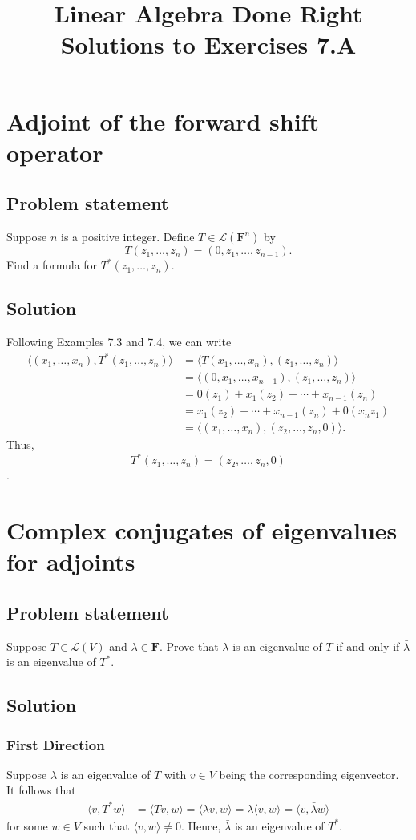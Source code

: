 \documentclass{article}
\title{Linear Algebra Done Right\\Solutions to Exercises 7.A}
\author{}
\date{}
\begin{document}
\maketitle

\section{Adjoint of the forward shift operator}
\subsection*{Problem statement}
Suppose $n$ is a positive integer. Define $T\in\mathcal{L}(\mathbf{F}^{n})$ by
\[T(z_1,\ldots,z_n)=(0,z_1,\ldots,z_{n-1}).\]
Find a formula for $T^*(z_1,\ldots,z_n)$.

\subsection*{Solution}
Following Examples 7.3 and 7.4, we can write
\begin{align*} 
\langle(x_1,\ldots,x_n),T^*(z_1,\ldots,z_n)\rangle &= \langle T(x_1,\ldots,x_n),(z_1,\ldots,z_n)\rangle \\ 
 &= \langle (0,x_1,\ldots,x_{n-1}),(z_1,\ldots,z_n)\rangle \\
 &= 0(z_1) + x_1(z_2) + \cdots + x_{n-1}(z_n) \\
 &= x_1(z_2) + \cdots + x_{n-1}(z_n) + 0(x_nz_1) \\
 &= \langle (x_1,\ldots,x_n),(z_2,\ldots,z_n,0)\rangle.
\end{align*}
Thus,
\[T^*(z_1,\ldots,z_n)=(z_2,\ldots,z_n,0)\].

\clearpage

\section{Complex conjugates of eigenvalues for adjoints}
\subsection*{Problem statement}
Suppose $T\in\mathcal{L}(V)$ and $\lambda\in\mathbf{F}$. Prove that $\lambda$ is an eigenvalue of $T$ if and only if $\bar{\lambda}$ is an eigenvalue of $T^*$.

\subsection*{Solution}
\subsubsection*{First Direction}
Suppose $\lambda$ is an eigenvalue of $T$ with $v\in V$ being the corresponding eigenvector. It follows that  
\begin{align*}
    \langle v, T^* w\rangle &= \langle Tv, w\rangle = \langle \lambda v, w\rangle = \lambda \langle v, w\rangle = \langle v, \bar{\lambda}w\rangle
\end{align*}
for some $w\in V$ such that $\langle v,w\rangle\neq 0$. Hence, $\bar{\lambda}$ is an eigenvalue of $T^*$.
\end{document}
